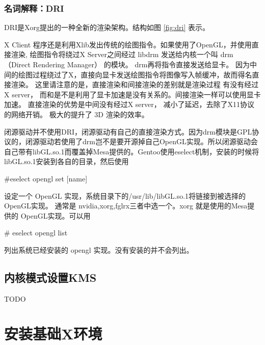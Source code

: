 \begin{insertnote}

\subsubsection{名词解释：DRI}

DRI是Xorg提出的一种全新的渲染架构。结构如图 \ref{fig:dri} 表示。



X Client 程序还是利用Xlib发出传统的绘图指令。如果使用了OpenGL，并使用直接渲染, 绘图指令将绕过X Server之间经过 libdrm 发送给内核一个叫 drm （Direct Rendering Manager） 的模块。
drm再将指令直接发送给显卡。 因为中间的绘图过程绕过了X，直接向显卡发送绘图指令将图像写入帧缓冲，故而得名直接渲染。 这里请注意的是，直接渲染和间接渲染的差别就是渲染过程 有没有经过X server， 而和是不是利用了显卡加速是没有关系的。间接渲染一样可以使用显卡加速。 直接渲染的优势是中间没有经过X server， 减小了延迟，去除了X11协议的网络开销。
极大的提升了 3D 渲染的效率。


闭源驱动并不使用DRI，闭源驱动有自己的直接渲染方式。因为drm模块是GPL协议的，闭源驱动若使用了drm岂不是要开源掉自己OpenGL实现。所以闭源驱动会自己带有libGL.so.1而覆盖掉Mesa提供的。Gentoo使用eselect机制，安装的时候将libGL.so.1安装到各自的目录，然后使用
\begin{code}
\#eselect opengl set [name] 
\end{code}
设定一个 OpenGL 实现，系统目录下的/usr/lib/libGL.so.1将链接到被选择的OpenGL实现。
通常是 nvidia,xorg,fglrx三者中选一个。xorg 就是使用的Mesa提供的 OpenGL实现。可以用
\begin{code}
\# eselect opengl list
\end{code}
 列出系统已经安装的 opengl 实现。没有安装的并不会列出。

\end{insertnote}

\subsection{内核模式设置KMS}

TODO



\section{安装基础X环境}

